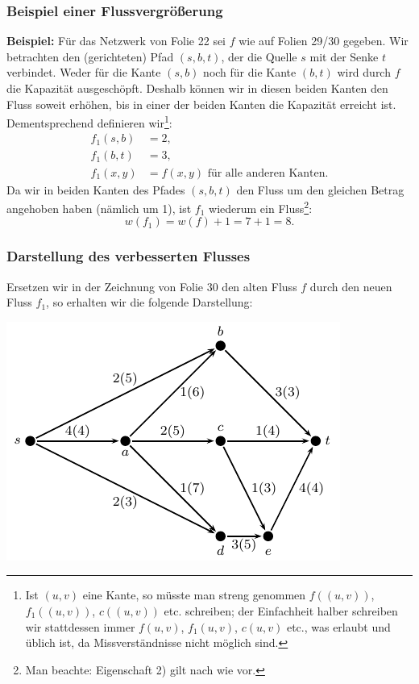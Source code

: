 \documentclass[smaller]{beamer}
\begin{document}
\begin{frame}
 \frametitle{Beispiel einer Flussvergrößerung}
 \textbf{Beispiel:}\label{page:9:9} Für das Netzwerk von Folie 22 sei $f$ wie auf Folien 29/30 gegeben. Wir betrachten den (gerichteten) Pfad $(s,b,t)$, der die Quelle $s$ mit der Senke $t$ verbindet. Weder für die Kante $(s,b)$ noch für die Kante $(b,t)$ wird durch $f$ die Kapazität ausgeschöpft. Deshalb können wir in diesen beiden Kanten den Fluss soweit erhöhen, bis in einer der beiden Kanten die Kapazität erreicht ist. Dementsprechend definieren wir\footnote{Ist $(u,v)$ eine Kante, so müsste man streng genommen $f((u,v))$, $f_1((u,v))$, $c((u,v))$ etc. schreiben; der Einfachheit halber schreiben wir stattdessen immer $f(u,v)$, $f_1(u,v)$, $c(u,v)$ etc., was {\glqq}erlaubt{\grqq} und üblich ist, da Missverständnisse nicht möglich sind.}:
\begin{align*}
f_1(s,b) &= 2, \\
f_1(b,t) &= 3, \\
f_1(x,y) &= f(x,y) \text{ für alle anderen Kanten}.
\end{align*}
Da wir in beiden Kanten des Pfades $(s,b,t)$ den Fluss um den gleichen Betrag angehoben haben (nämlich um 1), ist $f_1$ wiederum ein Fluss\footnote{Man beachte: Eigenschaft 2) gilt nach wie vor.}:
\[
w(f_1) = w(f) + 1 = 7 + 1 = 8.
\]
\end{frame}

\begin{frame}
 \frametitle{Darstellung des verbesserten Flusses}
 Ersetzen wir in der Zeichnung von Folie 30 den alten Fluss $f$ durch den neuen Fluss $f_1$, so erhalten wir die folgende Darstellung:
 \begin{center}
  \includegraphics{fig14.pdf}
 \end{center}
\end{frame}
\end{document}
